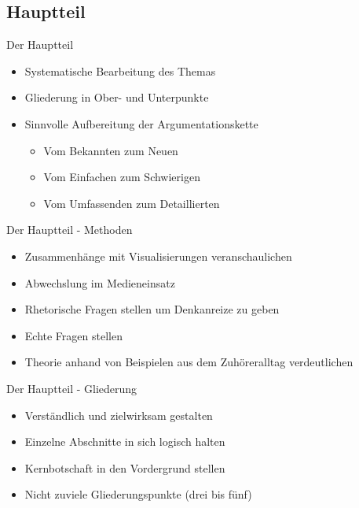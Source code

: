 \subsection{Hauptteil}
\begin{frame}{Der Hauptteil}
    \begin{itemize}[<+->]
        \item Systematische Bearbeitung des Themas
        \item Gliederung in Ober- und Unterpunkte
        \item Sinnvolle Aufbereitung der Argumentationskette
           \begin{itemize}[<+->]
                \item Vom Bekannten zum Neuen
                \item Vom Einfachen zum Schwierigen
                \item Vom Umfassenden zum Detaillierten
           \end{itemize}
    \end{itemize}
\end{frame}

\begin{frame}{Der Hauptteil - Methoden}
    \begin{itemize}[<+->]
        \item Zusammenhänge mit Visualisierungen veranschaulichen
        \item Abwechslung im Medieneinsatz
        \item Rhetorische Fragen stellen um Denkanreize zu geben
        \item Echte Fragen stellen
        \item Theorie anhand von Beispielen aus dem Zuhöreralltag verdeutlichen
    \end{itemize}
\end{frame}

\begin{frame}{Der Hauptteil - Gliederung}
    \begin{itemize}[<+->]
        \item Verständlich und zielwirksam gestalten
        \item Einzelne Abschnitte in sich logisch halten
        \item Kernbotschaft in den Vordergrund stellen
        \item Nicht zuviele Gliederungspunkte (drei bis fünf)
    \end{itemize}
\end{frame}

